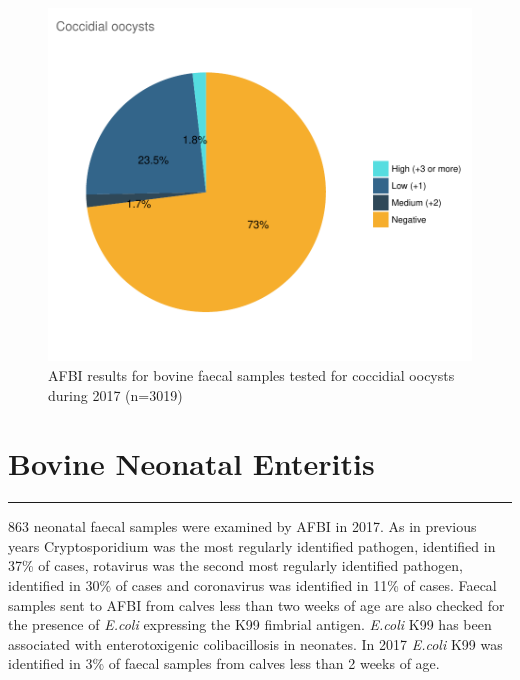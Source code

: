 \documentclass[]{book}
\begin{document}
\begin{figure}

{\centering \includegraphics{AFBI_files/figure-latex/unnamed-chunk-59-1} 

}

\caption{AFBI results for bovine faecal samples tested for coccidial oocysts during 2017 (n=3019)}\label{fig:unnamed-chunk-59}
\end{figure}

\chapter{Bovine Neonatal Enteritis}\label{bovine-neonatal-enteritis}

\begin{center}\rule{0.5\linewidth}{\linethickness}\end{center}

863 neonatal faecal samples were examined by AFBI in 2017. As in
previous years Cryptosporidium was the most regularly identified
pathogen, identified in 37\% of cases, rotavirus was the second most
regularly identified pathogen, identified in 30\% of cases and
coronavirus was identified in 11\% of cases. Faecal samples sent to AFBI
from calves less than two weeks of age are also checked for the presence
of \emph{E.coli} expressing the K99 fimbrial antigen. \emph{E.coli} K99
has been associated with enterotoxigenic colibacillosis in neonates. In
2017 \emph{E.coli} K99 was identified in 3\% of faecal samples from
calves less than 2 weeks of age.
\end{document}
